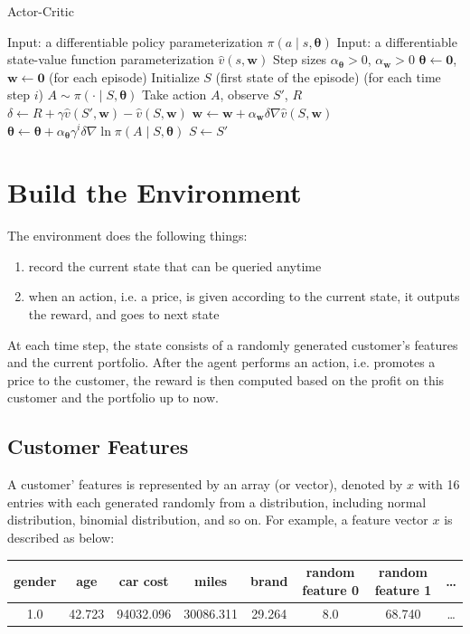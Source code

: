 \documentclass[11pt]{article}
\begin{document}
\begin{algorithm}[H]
\caption{Actor-Critic}
\begin{algorithmic}[1]
\State Input: a differentiable policy parameterization 
\(\pi\left(a\middle|s, \bm{\theta}\right)\)
\State Input: a differentiable state-value function parameterization
\(\hat{v}(s,\bm{w})\)
\State Step sizes \(\alpha_{\bm{\theta}}>0\), \(\alpha_{\bm{w}}>0\)
\State \(\bm{\theta} \gets \bm{0}\), \(\bm{w} \gets \bm{0}\)
\Loop \hspace{0.3mm} (for each episode)
    \State Initialize \(S\) (first state of the episode)
    \Loop \hspace{0.3mm} (for each time step \(i\))
        \State \(A\sim\pi\left(\cdot\middle|S, \bm{\theta}\right)\)
        \State Take action \(A\), observe \(S'\), \(R\)
        \State \(\delta \gets R + \gamma\hat{v}(S',\bm{w})-\hat{v}(S,\bm{w})\)
        \State \(\bm{w} \gets \bm{w} + 
        \alpha_{\bm{w}} \delta\nabla\hat{v}(S,\bm{w})\)
        \State \(\bm{\theta} \gets \bm{\theta} 
        + \alpha_{\bm{\theta}}\gamma^{i}\delta
        \nabla\ln{\pi\left(A\middle|S, \bm{\theta}\right)}\)
        \State \(S \gets S'\)
    \EndLoop
\EndLoop
\end{algorithmic}
\end{algorithm}

\section{Build the Environment}
The environment does the following things:
\begin{enumerate}
    \item record the current state that can be queried anytime
    \item when an action, i.e. a price, is given according to the current 
        state, it outputs the reward, and goes to next state
\end{enumerate}
At each time step, the state consists of a randomly generated customer's 
features and the current portfolio. After the agent performs an action, i.e.
promotes a price to the customer, the reward is then computed based on the 
profit on this customer and the portfolio up to now.

\subsection{Customer Features}
A customer' features is represented by an array (or vector), denoted by \(x\) 
with 16 entries with each generated randomly from a distribution, 
including normal distribution, binomial distribution, and so on. For example, 
a feature vector \(x\) is described as below:
\begin{table}[htpb]
    \centering
    \begin{tabular}{c|c|c|c|c|c|c|c}
        gender & age & car cost & miles & brand & random feature 0 & random 
        feature 1 & \dots\\
        \hline
        1.0 & 42.723 & 94032.096 & 30086.311 & 29.264 & 8.0 & 68.740 & \dots
    \end{tabular}
\end{table}
\end{document}

